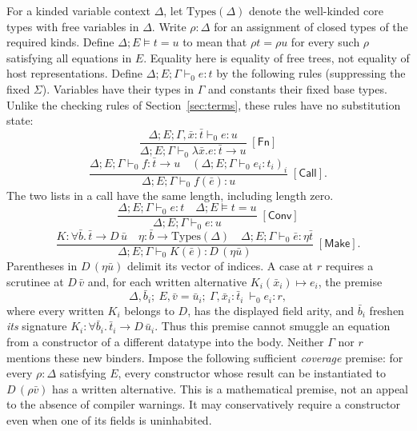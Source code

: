 \documentclass[11pt]{article}
\theoremstyle{definition}
\newcommand{\arr}{\mathbin{\to}}
\newcommand{\rrule}[3]{\frac{\displaystyle #2}{\displaystyle #3}
                       \;{\scriptstyle[\textsf{#1}]}}
\begin{document}
For a kinded variable context $\Delta$, let $\mathrm{Types}(\Delta)$
denote the well-kinded core types with free variables in $\Delta$.
Write $\rho:\Delta$ for an assignment of closed types of the required kinds. Define
$\Delta;E\models t=u$ to mean that $\rho t=\rho u$ for every such
$\rho$ satisfying all equations in $E$. Equality here is equality of free
trees, not equality of host representations. Define
$\Delta;E;\Gamma\vdash_0 e:t$ by the following rules (suppressing the
fixed $\Sigma$). Variables have their types in $\Gamma$ and constants
their fixed base types. Unlike the checking rules of
Section~\ref{sec:terms}, these rules have no substitution state:
\[
 \rrule{Fn}{\Delta;E;\Gamma,\bar x:\bar t\vdash_0 e:u}
           {\Delta;E;\Gamma\vdash_0 \lambda\bar x.e:\bar t\arr u}
\]
\[
 \rrule{Call}{\Delta;E;\Gamma\vdash_0 f:\bar t\arr u\quad
              (\Delta;E;\Gamma\vdash_0 e_i:t_i)_i}
             {\Delta;E;\Gamma\vdash_0 f(\bar e):u}.
\]
The two lists in a call have the same length, including length zero.
\[
 \rrule{Conv}{\Delta;E;\Gamma\vdash_0 e:t\quad\Delta;E\models t=u}
             {\Delta;E;\Gamma\vdash_0 e:u}
\]
\[
 \rrule{Make}{K:\forall\bar b.\,\bar t\arr D\,\bar u
       \quad\eta:\bar b\to\mathrm{Types}(\Delta)
       \quad\Delta;E;\Gamma\vdash_0\bar e:\eta\bar t}
       {\Delta;E;\Gamma\vdash_0 K(\bar e):D\,(\eta\bar u)}.
\]
Parentheses in $D\,(\eta\bar u)$ delimit its vector of indices. A case
at $r$ requires a scrutinee at $D\,\bar v$ and, for each written
alternative $K_i(\bar x_i)\mapsto e_i$, the premise
\[
 \Delta,\bar b_i;\
 E,\bar v=\bar u_i;\
 \Gamma,\bar x_i:\bar t_i\ \vdash_0 e_i:r,                  \tag{Case}
\]
where every written $K_i$ belongs to $D$, has the displayed field arity, and
$\bar b_i$ freshen \emph{its} signature $K_i:\forall\bar b_i.\,
\bar t_i\arr D\,\bar u_i$. Thus this premise cannot smuggle an equation
from a constructor of a different datatype into the body. Neither $\Gamma$
nor $r$ mentions these new binders. Impose the following sufficient
\emph{coverage} premise: for every $\rho:\Delta$ satisfying $E$, every
constructor whose result can be instantiated to $D\,(\rho\bar v)$
has a written alternative. This is a mathematical premise, not an appeal
to the absence of compiler warnings. It may conservatively require a
constructor even when one of its fields is uninhabited.
\end{document}
